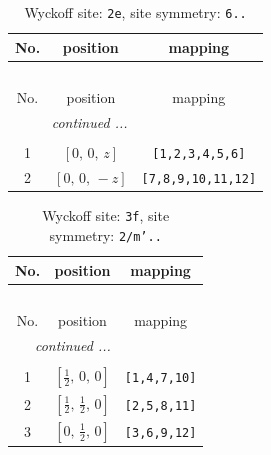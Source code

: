 \documentclass[fleqn,8pt]{jsarticle}
\begin{document}
\begin{longtable}{ccc}
\caption{Wyckoff site: {\tt 2e}, site symmetry: {\tt 6..}}
 \\
 \hline \hline
No. & position & mapping \\ \hline \endfirsthead

\multicolumn{2}{l}{\tablename\ \thetable{}} \\
 \hline \hline
No. & position & mapping \\ \hline \endhead

 \hline \hline
\multicolumn{2}{r}{\footnotesize\it continued ...} \\ \endfoot

 \hline \hline
\multicolumn{2}{r}{} \\ \endlastfoot

1 & $\left[ 0,\, 0,\, z \right]$ & {\tt [1,2,3,4,5,6]} \\ \hline
2 & $\left[ 0,\, 0,\, - z \right]$ & {\tt [7,8,9,10,11,12]} \\
\end{longtable}
\renewcommand{\arraystretch}{1.2}
\begin{longtable}{ccc}
\caption{Wyckoff site: {\tt 3f}, site symmetry: {\tt 2/m'..}}
 \\
 \hline \hline
No. & position & mapping \\ \hline \endfirsthead

\multicolumn{2}{l}{\tablename\ \thetable{}} \\
 \hline \hline
No. & position & mapping \\ \hline \endhead

 \hline \hline
\multicolumn{2}{r}{\footnotesize\it continued ...} \\ \endfoot

 \hline \hline
\multicolumn{2}{r}{} \\ \endlastfoot

1 & $\left[ \frac{1}{2},\, 0,\, 0 \right]$ & {\tt [1,4,7,10]} \\ \hline
2 & $\left[ \frac{1}{2},\, \frac{1}{2},\, 0 \right]$ & {\tt [2,5,8,11]} \\ \hline
3 & $\left[ 0,\, \frac{1}{2},\, 0 \right]$ & {\tt [3,6,9,12]} \\
\end{longtable}
\renewcommand{\arraystretch}{1.2}
\end{document}
